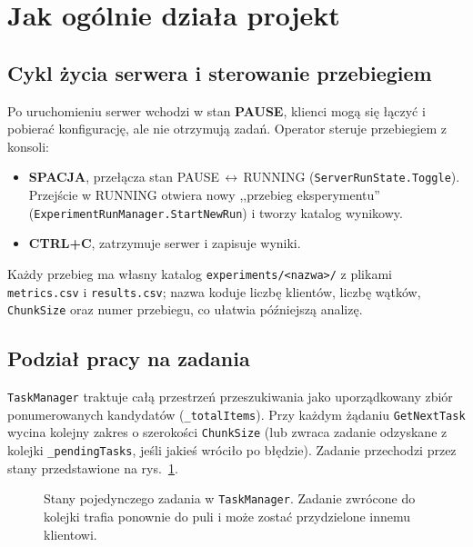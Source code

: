 \documentclass[11pt,a4paper]{article}
\begin{document}
\section{Jak ogólnie działa projekt}

\subsection{Cykl życia serwera i sterowanie przebiegiem}
Po uruchomieniu serwer wchodzi w stan \textbf{PAUSE}, klienci mogą się łączyć i pobierać
konfigurację, ale nie otrzymują zadań. Operator steruje przebiegiem z konsoli:
\begin{itemize}
  \item \textbf{SPACJA}, przełącza stan PAUSE\,$\leftrightarrow$\,RUNNING
        (\texttt{ServerRunState.Toggle}). Przejście w RUNNING otwiera nowy ,,przebieg
        eksperymentu'' (\texttt{ExperimentRunManager.StartNewRun}) i tworzy katalog wynikowy.
  \item \textbf{CTRL+C}, zatrzymuje serwer i zapisuje wyniki.
\end{itemize}
Każdy przebieg ma własny katalog \texttt{experiments/<nazwa>/} z plikami \texttt{metrics.csv}
i \texttt{results.csv}; nazwa koduje liczbę klientów, liczbę wątków, \texttt{ChunkSize} oraz
numer przebiegu, co ułatwia późniejszą analizę.

\subsection{Podział pracy na zadania}
\texttt{TaskManager} traktuje całą przestrzeń przeszukiwania jako uporządkowany zbiór
ponumerowanych kandydatów (\texttt{\_totalItems}). Przy każdym żądaniu \texttt{GetNextTask}
wycina kolejny zakres o szerokości \texttt{ChunkSize} (lub zwraca zadanie odzyskane z kolejki
\texttt{\_pendingTasks}, jeśli jakieś wróciło po błędzie). Zadanie przechodzi przez stany
przedstawione na rys.~\ref{fig:states}.

\begin{figure}[H]
\centering
{}
\caption{Stany pojedynczego zadania w \texttt{TaskManager}. Zadanie zwrócone do kolejki trafia
ponownie do puli i może zostać przydzielone innemu klientowi.}
\label{fig:states}
\end{figure}
\end{document}
